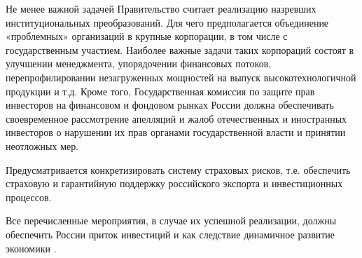 Не менее важной задачей Правительство считает реализацию назревших институциональных преобразований. Для чего предполагается объединение «проблемных» организаций в крупные корпорации, в том числе с государственным участием. Наиболее важные задачи таких корпораций состоят в улучшении менеджмента, упорядочении финансовых потоков, перепрофилировании незагруженных мощностей на выпуск высокотехнологичной продукции и т.д. Кроме того, Государственная комиссия по защите прав инвесторов на финансовом и фондовом рынках России должна обеспечивать своевременное рассмотрение апелляций и жалоб отечественных и иностранных инвесторов о нарушении их прав органами государственной власти и принятии неотложных мер.

Предусматривается конкретизировать систему страховых рисков, т.е. обеспечить страховую и гарантийную поддержку российского экспорта и инвестиционных процессов.

Все перечисленные мероприятия, в случае их успешной реализации, должны обеспечить России приток инвестиций и как следствие динамичное развитие экономики \cite{01}.

